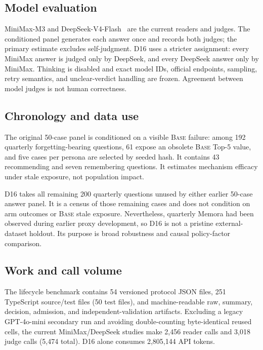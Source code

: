 \documentclass[10pt]{article}
\newcommand{\base}{\textsc{Base}\xspace}
\begin{document}
\subsection{Model evaluation}

MiniMax-M3 and DeepSeek-V4-Flash~\cite{minimax2026m3,deepseek2026v4} are the current readers and judges. The conditioned panel generates each answer once and records both judges; the primary estimate excludes self-judgment. D16 uses a stricter assignment: every MiniMax answer is judged only by DeepSeek, and every DeepSeek answer only by MiniMax. Thinking is disabled and exact model IDs, official endpoints, sampling, retry semantics, and unclear-verdict handling are frozen. Agreement between model judges is not human correctness.

\subsection{Chronology and data use}

The original 50-case panel is conditioned on a visible \base failure: among 192 quarterly forgetting-bearing questions, 61 expose an obsolete \base Top-5 value, and five cases per persona are selected by seeded hash. It contains 43 recommending and seven remembering questions. It estimates mechanism efficacy under stale exposure, not population impact.

D16 takes all remaining 200 quarterly questions unused by either earlier 50-case answer panel. It is a census of those remaining cases and does not condition on arm outcomes or \base stale exposure. Nevertheless, quarterly Memora had been observed during earlier proxy development, so D16 is not a pristine external-dataset holdout. Its purpose is broad robustness and causal policy-factor comparison.

\subsection{Work and call volume}

The lifecycle benchmark contains 54 versioned protocol JSON files, 251 TypeScript source/test files (50 test files), and machine-readable raw, summary, decision, admission, and independent-validation artifacts. Excluding a legacy GPT-4o-mini secondary run and avoiding double-counting byte-identical reused cells, the current MiniMax/DeepSeek studies make 2,456 reader calls and 3,018 judge calls (5,474 total). D16 alone consumes 2,805,144 API tokens.
\end{document}
